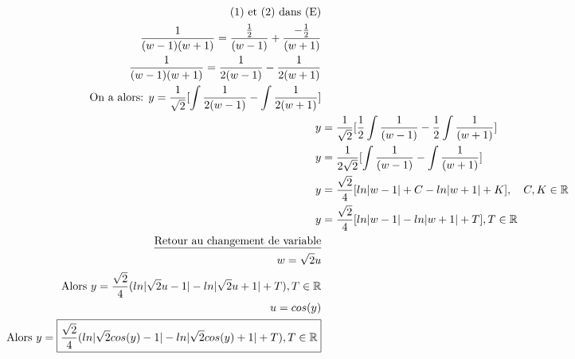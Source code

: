 \begin{align*}
	\text{(1) et (2) dans (E)} \\
	\frac{1}{(w-1)(w+1)} = \frac{\frac{1}{2}}{(w-1)} + \frac{-\frac{1}{2}}{(w+1)} \\
	\frac{1}{(w-1)(w+1)} = \frac{1}{2(w-1)} - \frac{1}{2(w+1)} \\
	\text{On a alors: } y = \frac{1}{\sqrt{2}}[\int\frac{1}{2(w-1)} - \int\frac{1}{2(w+1)}] \\
	y &= \frac{1}{\sqrt{2}}[\frac{1}{2}\int\frac{1}{(w-1)} - \frac{1}{2}\int\frac{1}{(w+1)}] \\
	y &= \frac{1}{2\sqrt{2}}[\int\frac{1}{(w-1)} - \int\frac{1}{(w+1)}] \\
	y &= \frac{\sqrt{2}}{4}[ln|w-1| + C - ln|w+1| + K], \quad C, K \in \mathbb{R} \\
	y &= \frac{\sqrt{2}}{4}[ln|w-1| - ln|w+1| + T], T \in \mathbb{R} \\
	\text{\underline{Retour au changement de variable}} \\
	w = \sqrt{2}u \\
	\text{Alors } y = \frac{\sqrt{2}}{4}(ln|\sqrt{2}u-1| - ln|\sqrt{2}u+1| + T), T \in \mathbb{R} \\
	u = cos(y) \\
	\text{Alors } y = \boxed{\frac{\sqrt{2}}{4}(ln|\sqrt{2}cos(y)-1| - ln|\sqrt{2}cos(y)+1| + T), T \in \mathbb{R}}
\end{align*}